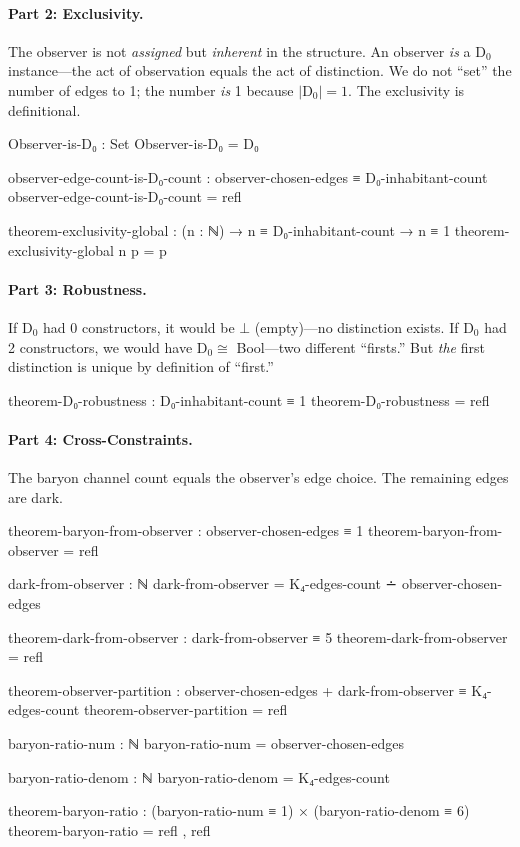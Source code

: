 \documentclass[11pt,a4paper]{book}
\begin{document}
\paragraph{Part 2: Exclusivity.}
The observer is not \emph{assigned} but \emph{inherent} in the structure. 
An observer \emph{is} a D$_0$ instance---the act of observation equals the act of 
distinction. We do not ``set'' the number of edges to 1; the number \emph{is} 1 
because $|$D$_0| = 1$. The exclusivity is definitional.

\begin{code}
Observer-is-D₀ : Set
Observer-is-D₀ = D₀

observer-edge-count-is-D₀-count : observer-chosen-edges ≡ D₀-inhabitant-count
observer-edge-count-is-D₀-count = refl

theorem-exclusivity-global : (n : ℕ) → n ≡ D₀-inhabitant-count → n ≡ 1
theorem-exclusivity-global n p = p
\end{code}

\paragraph{Part 3: Robustness.}
If D$_0$ had 0 constructors, it would be $\bot$ (empty)---no distinction exists. 
If D$_0$ had 2 constructors, we would have D$_0 \cong$ Bool---two different ``firsts.'' 
But \emph{the} first distinction is unique by definition of ``first.''

\begin{code}
theorem-D₀-robustness : D₀-inhabitant-count ≡ 1
theorem-D₀-robustness = refl
\end{code}

\paragraph{Part 4: Cross-Constraints.}
The baryon channel count equals the observer's edge choice. The remaining edges are dark.

\begin{code}
theorem-baryon-from-observer : observer-chosen-edges ≡ 1
theorem-baryon-from-observer = refl

dark-from-observer : ℕ
dark-from-observer = K₄-edges-count ∸ observer-chosen-edges

theorem-dark-from-observer : dark-from-observer ≡ 5
theorem-dark-from-observer = refl

theorem-observer-partition : observer-chosen-edges + dark-from-observer ≡ K₄-edges-count
theorem-observer-partition = refl

baryon-ratio-num : ℕ
baryon-ratio-num = observer-chosen-edges

baryon-ratio-denom : ℕ
baryon-ratio-denom = K₄-edges-count

theorem-baryon-ratio : (baryon-ratio-num ≡ 1) × (baryon-ratio-denom ≡ 6)
theorem-baryon-ratio = refl , refl
\end{code}
\end{document}
